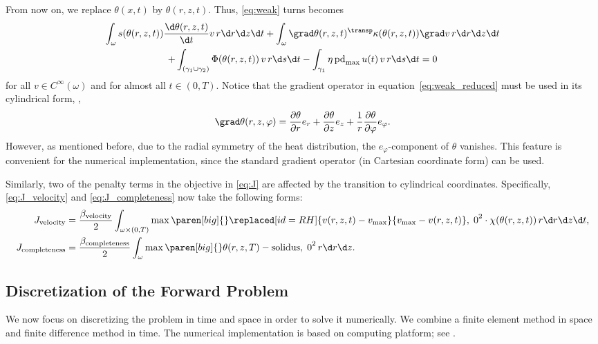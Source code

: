 From now on, we replace $\theta(x,t)$ by $\theta(r,z,t)$. 
Thus, \eqref{eq:weak} turns becomes
\begin{multline} \label{eq:weak_reduced}
	\int_\omega s(\theta(r,z,t)) \frac{\d \theta(r,z,t)}{\d t} v \, r \d r \d z \d t
	+
	\int_\omega \grad\theta(r,z,t)^\transp \kappa(\theta(r,z,t)) \grad v \, r \d r \d z \d t 
	\\
	+
	\int_{(\gamma_1 \cup \gamma_2)} \Phi(\theta(r,z,t)) \, v \, r \d s \d t -
	\int_{\gamma_1} \eta \, \text{pd}_{\max} \, u(t) \, v \, r \d s \d t 
	= 
	0
\end{multline}
for all $v \in C^\infty(\omega)$ and for almost all $t \in (0,T)$.
Notice that the gradient operator in equation~\eqref{eq:weak_reduced} must be used in its cylindrical form, \ie,
\begin{equation*}
	\grad \theta(r,z,\varphi) 
	=
	\frac{\partial \theta}{\partial r} e_r
	+
	\frac{\partial \theta}{\partial z} e_z
	+
	\frac{1}{r} \frac{\partial \theta}{\partial \varphi} e_{\varphi}
	.
\end{equation*}
However, as mentioned before, due to the radial symmetry of the heat distribution, the $e_{\varphi}$-component of $\theta$ vanishes. 
This feature is convenient for the numerical implementation, since the standard gradient operator (in Cartesian coordinate form) can be used.

Similarly, two of the penalty terms in the objective in \eqref{eq:J} are affected by the transition to cylindrical coordinates.
Specifically, \eqref{eq:J_velocity} and \eqref{eq:J_completeness} now take the following forms:
\begin{align}
	\label{eq:J_velocity_r}
	J_\textup{velocity} 
	&
	=
	\frac{\beta_\textup{velocity}}{2} \int_{\omega \times (0,T)} \max \paren[big]\{\}{\replaced[id=RH]{v(r,z,t) - v_{\max}}{v_{\max} - v(r,z,t)}, \; 0}^2 \cdot \chi(\theta(r,z,t)) \, r \d r \d z \d t
	, 
	\\
	\label{eq:J_completeness_r}
	J_\textup{completeness} 
	&
	=
	\frac{\beta_\textup{completeness}}{2} \int_{\omega} \max \paren[big]\{\}{\theta(r,z,T) - \text{solidus}, \; 0}^2 \, r \d r \d z
	.
\end{align}


\subsection{Discretization of the Forward Problem}

We now focus on discretizing the problem in time and space in order to solve it numerically. 
We combine a finite element method in space and finite difference method in time. 
The numerical implementation is based on \fenics computing platform; see \cite{LoggMardalWells:2012:1}.

